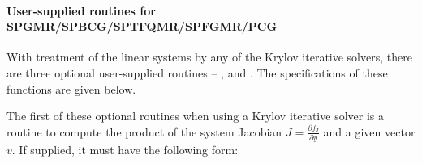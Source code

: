 \documentclass[letterpaper,10pt,english]{sphinxmanual}
\begin{document}
\paragraph{User-supplied routines for SPGMR/SPBCG/SPTFQMR/SPFGMR/PCG}
\label{f_interface/Usage:user-supplied-routines-for-spgmr-spbcg-sptfqmr-spfgmr-pcg}\label{f_interface/Usage:finterface-spilsusersupplied}
With treatment of the linear systems by any of the Krylov iterative
solvers, there are three optional user-supplied routines --
{\hyperref[f_interface/Usage:f/_/FARKJTIMES]{}}, {\hyperref[f_interface/Usage:f/_/FARKPSET]{}} and {\hyperref[f_interface/Usage:f/_/FARKPSOL]{}}.
The specifications of these functions are given below.

The first of these optional routines when using a Krylov iterative
solver is a routine to compute the product of the system Jacobian
$J = \frac{\partial f_I}{\partial y}$ and a given vector
$v$.  If supplied, it must have the following form:
\end{document}
